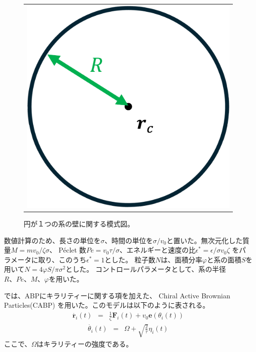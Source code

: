 \documentclass[/Users/ikedahajime/GitHub/reserch/master_report/thesis]{subfiles}
\begin{document}
\begin{figure}
    \centering
    \begin{tabular}{c}
        \begin{minipage}{0.2\hsize}
            \includegraphics[width=\textwidth]{img/method/fig_sincer.png}
        \end{minipage}
    \end{tabular}
    \caption[fig:circle]
    {
        円が１つの系の壁に関する模式図。
    }
    \label{fig:setup_circles}
\end{figure}
数値計算のため、長さの単位を$\sigma$、時間の単位を$\sigma/v_0$と置いた。無次元化した質量$M=mv_0/\zeta\sigma$、
 Péclet 数$Pe=v_0\tau/\sigma$、エネルギーと速度の比$\epsilon^*=\epsilon/\sigma v_0 \zeta$
をパラメータに取り、このうち$\epsilon^*=1$とした。
粒子数$N$は、面積分率$\varphi$と系の面積$S$を用いて$N=4\varphi S/\pi\sigma^2$とした。
コントロールパラメータとして、系の半径$R、Pe、M、\varphi$を用いた。


では、ABPにキラリティーに関する項を加えた、 Chiral Active Brownian Particles(CABP)%
を用いた。このモデルは以下のように表される。
\begin{eqnarray}
    \dot{\bm{r}_i}(t) &=& \frac{1}{\zeta} \bm{F}_i(t)+v_0 \bm{e}(\theta_i (t))
\end{eqnarray}
\begin{eqnarray}
    \dot{\theta_i }(t) &=& \Omega+\sqrt{\frac{2}{\tau}}\eta_i(t)
\end{eqnarray}
ここで、$\Omega$はキラリティーの強度である。
\end{document}
